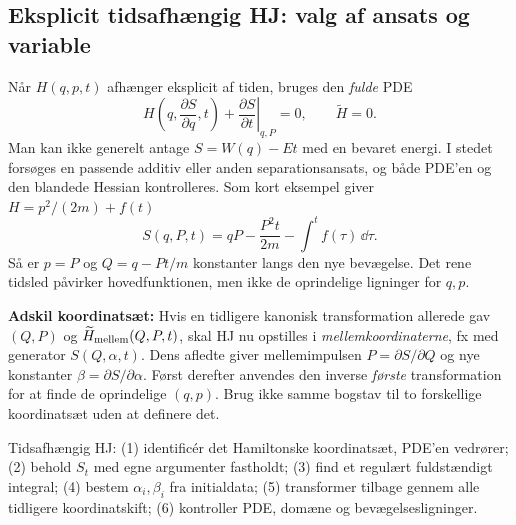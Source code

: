 \subsection{Eksplicit tidsafhængig HJ: valg af ansats og variable}
Når $H(q,p,t)$ afhænger eksplicit af tiden, bruges den \emph{fulde} PDE
\[
\boxed{H\left(q,\frac{\partial S}{\partial q},t\right)+
\left.\frac{\partial S}{\partial t}\right|_{q,P}=0},
\qquad \widetilde H=0.
\]
Man kan ikke generelt antage $S=W(q)-Et$ med en bevaret energi. I stedet forsøges en passende additiv eller anden separationsansats, og både PDE'en og den blandede Hessian kontrolleres. Som kort eksempel giver $H=p^2/(2m)+f(t)$
\[
S(q,P,t)=qP-\frac{P^2t}{2m}-\int^t f(\tau)\,\dd\tau.
\]
Så er $p=P$ og $Q=q-Pt/m$ konstanter langs den nye bevægelse. Det rene tidsled påvirker hovedfunktionen, men ikke de oprindelige ligninger for $q,p$.

\textbf{Adskil koordinatsæt:} Hvis en tidligere kanonisk transformation allerede gav $(Q,P)$ og $\widetilde H_{\rm mellem}(Q,P,t)$, skal HJ nu opstilles i \emph{mellemkoordinaterne}, fx med generator $S(Q,\alpha,t)$. Dens afledte giver mellemimpulsen $P=\partial S/\partial Q$ og nye konstanter $\beta=\partial S/\partial\alpha$. Først derefter anvendes den inverse \emph{første} transformation for at finde de oprindelige $(q,p)$. Brug ikke samme bogstav til to forskellige koordinatsæt uden at definere det.
\begin{method}Tidsafhængig HJ: (1) identificér det Hamiltonske koordinatsæt, PDE'en vedrører; (2) behold $S_t$ med egne argumenter fastholdt; (3) find et regulært fuldstændigt integral; (4) bestem $\alpha_i,\beta_i$ fra initialdata; (5) transformer tilbage gennem alle tidligere koordinatskift; (6) kontroller PDE, domæne og bevægelsesligninger.\end{method}




